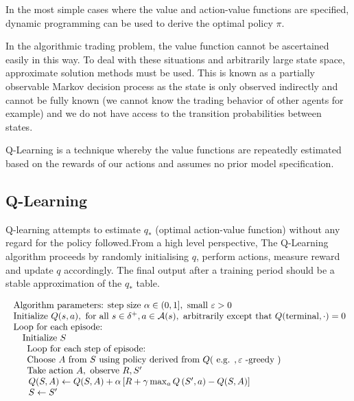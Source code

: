 \documentclass[12pt]{article}
\begin{document}
In the most simple cases where the value and action-value functions are specified, dynamic programming can be used to derive the optimal policy $\pi$.







In the algorithmic trading problem, the value function cannot be ascertained easily in this way. To deal with these situations and arbitrarily large state space, approximate solution methods must be used. This is known as a partially observable Markov decision process as the state is only observed indirectly and cannot be fully known (we cannot know the trading behavior of other agents for example) and we do not have access to the transition probabilities between states.

Q-Learning is a technique whereby the value functions are repeatedly estimated based on the rewards of our actions and assumes no prior model specification.


\subsection{Q-Learning} 

Q-learning attempts to estimate $q_{*}$ (optimal action-value function) without any regard for the policy followed.From a high level perspective, The Q-Learning algorithm proceeds by randomly initialising $q$, perform actions, measure reward and update $q$ accordingly. The final output after a training period should be a stable approximation of the $q_{*}$ table.

$$
\begin{array} { l } { \text { Algorithm parameters: step size } \alpha \in ( 0,1 ] , \text { small } \varepsilon > 0 } \\ { \text { Initialize } Q ( s , a ) , \text { for all } s \in \delta ^ { + } , a \in \mathcal { A } ( s ) , \text { arbitrarily except that } Q ( \text {terminal} , \cdot ) = 0 }  \\
\text{ Loop for each episode:} \\
\quad\text{ Initialize } S \\
\indent \text{ Loop for each step of episode:} \\
 \indent{ \text { Choose } A \text { from } S \text { using policy derived from } Q ( \text { e.g. } , \varepsilon \text { -greedy } ) } \\ \indent{ \text { Take action } A , \text { observe } R , S ^ { \prime } } \\ \indent { \hphantom{1}Q ( S , A ) \leftarrow Q ( S , A ) + \alpha \left[ R + \gamma \max _ { a } Q \left( S ^ { \prime } , a \right) - Q ( S , A ) \right] } \\ \indent{ \hphantom{1} S \leftarrow S ^ { \prime } }\\
\end{array}
$$ 
\end{document}
